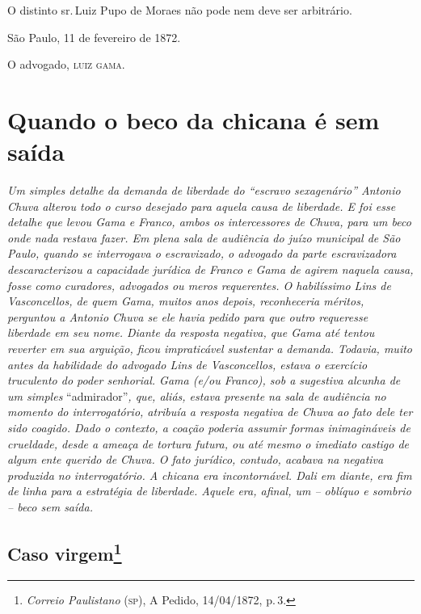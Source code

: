 O distinto sr.\,Luiz Pupo de Moraes não pode nem deve ser arbitrário.

São Paulo, 11 de fevereiro de 1872.

O advogado, \textsc{luiz gama}.

\part{Quando o beco da chicana é sem saída}

\begin{argumento}
\emph{Um simples detalhe da demanda de liberdade do ``escravo
sexagenário'' Antonio Chuva alterou todo o curso desejado para aquela
causa de liberdade. E foi esse detalhe que levou Gama e Franco, ambos os
intercessores de Chuva, para um beco onde nada restava fazer. Em plena
sala de audiência do juízo municipal de São Paulo, quando se interrogava
o escravizado, o advogado da parte escravizadora descaracterizou a
capacidade jurídica de Franco e Gama de agirem naquela causa, fosse como
curadores, advogados ou meros requerentes. O habilíssimo Lins de
Vasconcellos, de quem Gama, muitos anos depois, reconheceria méritos,
perguntou a Antonio Chuva se ele havia pedido para que outro requeresse
liberdade em seu nome. Diante da resposta negativa, que Gama até tentou
reverter em sua arguição, ficou impraticável sustentar a demanda.
Todavia, muito antes da habilidade do advogado Lins de Vasconcellos,
estava o exercício truculento do poder senhorial. Gama (e/ou Franco),
sob a sugestiva alcunha de um simples} ``admirador''\emph{, que, aliás,
estava presente na sala de audiência no momento do interrogatório,
atribuía a resposta negativa de Chuva ao fato dele ter sido coagido.
Dado o contexto, a coação poderia assumir formas inimagináveis de
crueldade, desde a ameaça de tortura futura, ou até mesmo o imediato
castigo de algum ente querido de Chuva. O fato jurídico, contudo,
acabava na negativa produzida no interrogatório. A chicana era
incontornável. Dali em diante, era fim de linha para a estratégia de
liberdade. Aquele era, afinal, um -- oblíquo e sombrio -- beco sem
saída.}
\end{argumento}

\chapter{Caso virgem\footnote{\emph{Correio Paulistano} (\textsc{sp}), A Pedido, 14/04/1872,
  p.\,3.}} %

